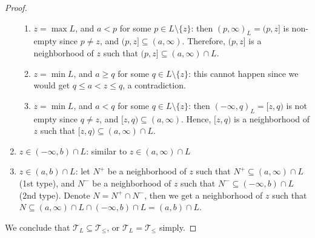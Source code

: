 \documentclass{treatise}
\begin{document}
\begin{proof}
\begin{enumerate}
\begin{enumerate}
        \item $z = \max L$, and $a < p$ for some $p \in L \setminus \{ z \}$: then $(p, \infty)_L = (p, z]$ is non-empty since $p \neq z$, and $(p, z] \subseteq (a, \infty)$. Therefore, $(p, z]$ is a neighborhood of $z$ such that $(p, z] \subseteq (a, \infty) \cap L$.
        \item $z = \min L$, and $a \geq q$ for some $q \in L \setminus \{ z \}$: this cannot happen since we would get $q \leq a < z \leq q$, a contradiction.
        \item $z = \min L$, and $a < q$ for some $q \in L \setminus \{ z \}$: then $(-\infty, q)_L = [z, q)$ is not empty since $q \neq z$, and $[z, q) \subseteq (a, \infty)$. Hence, $[z, q)$ is a neighborhood of $z$ such that $[z, q) \subseteq (a, \infty) \cap L$.
    \end{enumerate}
    \item $z \in (-\infty, b) \cap L$: similar to $z \in (a, \infty) \cap L$
    \item $z \in (a, b) \cap L$: let $N^+$ be a neighborhood of $z$ such that $N^+ \subseteq (a, \infty) \cap L$ (1st type), and $N^-$ be a neighborhood of $z$ such that $N^- \subseteq (-\infty, b) \cap L$ (2nd type). Denote $N = N^+ \cap N^-$, then we get a neighborhood of $z$ such that $N \subseteq (a, \infty) \cap L \cap (-\infty, b) \cap L = (a, b) \cap L$.
\end{enumerate}
We conclude that $\mathcal{T}_L \subseteq \mathcal{T}_{\leq}$, or $\mathcal{T}_L = \mathcal{T}_{\leq}$ simply.
\end{proof}
\end{document}
